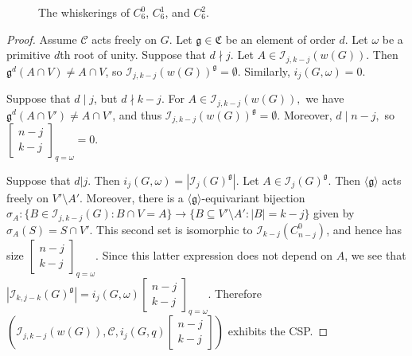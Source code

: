 \documentclass[12pt]{article}
\theoremstyle{definition}
\newcommand{\gau}[2]{\left[ \begin{array}{c} #1 \\ #2 \end{array} \right]}
\begin{document}
\begin{figure}
\begin{center}
\caption{The whiskerings of $C_6^0$, $C_6^1$, and $C_6^2$.}
\label{fig:whisker}
\end{center}
\end{figure}

\begin{proof}
Assume $\mathcal{C}$ acts freely on $G$. 
Let $\mathfrak{g} \in \mathfrak{C}$ be an element of order $d$.
 Let $\omega$ be a primitive $d$th root of unity. Suppose that $d \nmid j.$ Let $A \in \mathcal{I}_{j,k-j}(w(G)).$ Then $\mathfrak{g}^d(A \cap V) \neq A \cap V$, so $\mathcal{I}_{j,k-j}(w(G))^{\mathfrak{g}} = \emptyset.$ Similarly, $i_j(G,\omega) = 0.$

 Suppose that $d \mid j$, but $d \nmid k-j.$ For $A \in \mathcal{I}_{j,k-j}(w(G)),$ we have $\mathfrak{g}^d(A \cap V') \neq A \cap V'$, and thus $\mathcal{I}_{j,k-j}(w(G))^{\mathfrak{g}} = \emptyset.$ Moreover, $d \mid n-j, $ so $\gau{n-j}{k-j}_{q=\omega} = 0.$

 Suppose that $d | j.$ Then $i_j(G,\omega) = |\mathcal{I}_j(G)^{\mathfrak{g}}|$. Let $A \in \mathcal{I}_j(G)^{\mathfrak{g}}.$ Then $\langle \mathfrak{g} \rangle$ acts freely on $V' \setminus A'.$ Moreover, there is a $\langle \mathfrak{g} \rangle$-equivariant bijection $\sigma_A: \{B \in \mathcal{I}_{j,k-j}(G): B \cap V = A\} \to \{B \subseteq V' \setminus A': |B| = k-j \}$ given by $\sigma_A(S) = S \cap V'.$ This second set is isomorphic to $\mathcal{I}_{k-j}(C_{n-j}^0)$, and hence has size $\gau{n-j}{k-j}_{q=\omega}$. Since this latter expression does not depend on $A$, we see that $|\mathcal{I}_{k,j-k}(G)^{\mathfrak{g}}| = i_j(G,\omega)\gau{n-j}{k-j}_{q=\omega}.$
Therefore $\left(\mathcal{I}_{j,k-j}(w(G)), \mathcal{C}, i_j(G,q)\gau{n-j}{k-j} \right)$ exhibits the CSP.
\end{proof}
\end{document}
